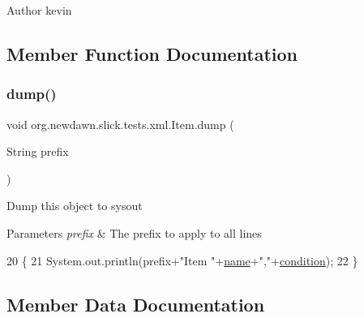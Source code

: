\begin{DoxyAuthor}{Author}
kevin 
\end{DoxyAuthor}


\subsection{Member Function Documentation}
\mbox{\label{classorg_1_1newdawn_1_1slick_1_1tests_1_1xml_1_1_item_a2a3b9188cb3353e8451c5df71c783e5a}} 
\subsubsection{\texorpdfstring{dump()}{dump()}}
{\footnotesize\ttfamily void org.\+newdawn.\+slick.\+tests.\+xml.\+Item.\+dump (\begin{DoxyParamCaption}\item[{String}]{prefix }\end{DoxyParamCaption})\hspace{0.3cm}{\ttfamily [inline]}}

Dump this object to sysout


\begin{DoxyParams}{Parameters}
{\em prefix} & The prefix to apply to all lines \\
\hline
\end{DoxyParams}

\begin{DoxyCode}
20                                     \{
21         System.out.println(prefix+\textcolor{stringliteral}{"Item "}+\mbox{\hyperlink{classorg_1_1newdawn_1_1slick_1_1tests_1_1xml_1_1_item_a5bbf1293e61bcd4d8c543caae4e3c967}{name}}+\textcolor{stringliteral}{","}+\mbox{\hyperlink{classorg_1_1newdawn_1_1slick_1_1tests_1_1xml_1_1_item_a17a71d3cab0191fbd90b875a6483efea}{condition}});
22     \}
\end{DoxyCode}


\subsection{Member Data Documentation}
\mbox{\label{classorg_1_1newdawn_1_1slick_1_1tests_1_1xml_1_1_item_a17a71d3cab0191fbd90b875a6483efea}} 
